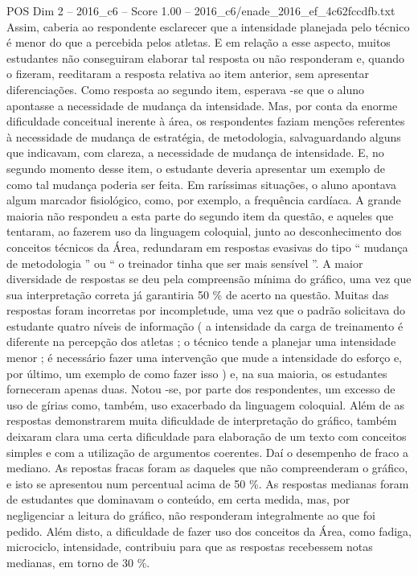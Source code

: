 \begin{textsample}{POS Dim 2 – 2016\_c6 – Score 1.00 – 2016\_c6/enade\_2016\_ef\_4c62fccdfb.txt}
Assim, caberia ao respondente esclarecer que a intensidade planejada pelo técnico é menor do que a percebida pelos atletas.
E em relação a esse aspecto, muitos estudantes não conseguiram elaborar tal resposta ou não responderam e, quando o fizeram, reeditaram a resposta relativa ao item anterior, sem apresentar diferenciações.
Como resposta ao segundo item, esperava -se que o aluno apontasse a necessidade de mudança da intensidade.
Mas, por conta da enorme dificuldade conceitual inerente à área, os respondentes faziam menções referentes à necessidade de mudança de estratégia, de metodologia, salvaguardando alguns que indicavam, com clareza, a necessidade de mudança de intensidade.
E, no segundo momento desse item, o estudante deveria apresentar um exemplo de como tal mudança poderia ser feita.
Em raríssimas situações, o aluno apontava algum marcador fisiológico, como, por exemplo, a frequência cardíaca.
A grande maioria não respondeu a esta parte do segundo item da questão, e aqueles que tentaram, ao fazerem uso da linguagem coloquial, junto ao desconhecimento dos conceitos técnicos da Área, redundaram em respostas evasivas do tipo “ mudança de metodologia ” ou “ o treinador tinha que ser mais sensível ”.
A maior diversidade de respostas se deu pela compreensão mínima do gráfico, uma vez que sua interpretação correta já garantiria 50 \% de acerto na questão.
Muitas das respostas foram incorretas por incompletude, uma vez que o padrão solicitava do estudante quatro níveis de informação ( a intensidade da carga de treinamento é diferente na percepção dos atletas ; o técnico tende a planejar uma intensidade menor ; é necessário fazer uma intervenção que mude a intensidade do esforço e, por último, um exemplo de como fazer isso ) e, na sua maioria, os estudantes forneceram apenas duas.
Notou -se, por parte dos respondentes, um excesso de uso de gírias como, também, uso exacerbado da linguagem coloquial.
Além de as respostas demonstrarem muita dificuldade de interpretação do gráfico, também deixaram clara uma certa dificuldade para elaboração de um texto com conceitos simples e com a utilização de argumentos coerentes.
Daí o desempenho de fraco a mediano.
As repostas fracas foram as daqueles que não compreenderam o gráfico, e isto se apresentou num percentual acima de 50 \%.
As respostas medianas foram de estudantes que dominavam o conteúdo, em certa medida, mas, por negligenciar a leitura do gráfico, não responderam integralmente ao que foi pedido.
Além disto, a dificuldade de fazer uso dos conceitos da Área, como fadiga, microciclo, intensidade, contribuiu para que as respostas recebessem notas medianas, em torno de 30 \%.

\end{textsample}

